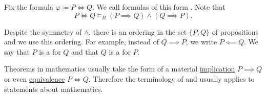 \begin{definition}\label{def:equivalence}
  Fix the formula \( \varphi \coloneqq P \iff Q \). We call formulas of this form . Note that
  \begin{equation*}
    P \iff Q \models_B (P \implies Q) \land (Q \implies P).
  \end{equation*}

   Despite the symmetry of \( \land \), there is an ordering in the set \( \{ P, Q \} \) of propositions and we use this ordering. For example, instead of \( Q \implies P \), we write \( P \impliedby Q \). We say that \( P \) is a  for \( Q \) and that \( Q \) is a  for \( P \).
\end{definition}

\begin{remark}\label{remark:statements_as_implications}
  Theorems in mathematics usually take the form of a material \hyperref[def:material_implication]{implication} \( P \implies Q \) or even \hyperref[def:equivalence]{equivalence} \( P \iff Q \). Therefore the terminology of  and  usually applies to statements about mathematics.
\end{remark}
